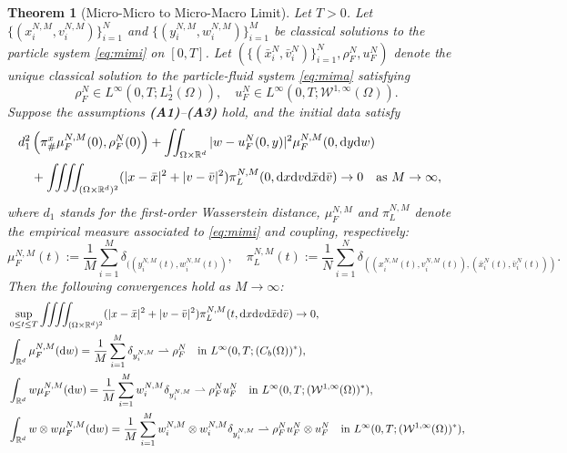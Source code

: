 \documentclass[10pt, reqno]{amsart}
\newtheorem{theorem}{Theorem}[section]
\theoremstyle{definition}
\theoremstyle{remark}
\numberwithin{equation}{section}
\newcommand{\dx}{\textnormal{d}x}
\newcommand{\dy}{\textnormal{d}y}
\newcommand{\dv}{\textnormal{d}v}
\newcommand{\dw}{\textnormal{d}w}
\newcommand{\calW}{\mathcal W}
\newcommand{\R}{\mathbb{R}}
\newcommand{\weakto}{\rightharpoonup}
\begin{document}
\begin{theorem}[Micro-Micro to Micro-Macro Limit]\label{thm:mimi-mima}
Let $T>0$. Let $ \{(x^{N,M}_i,v^{N,M}_i) \}_{i=1}^N$ and $ \{(y^{N,M}_i,w^{N,M}_i) \}_{i=1}^M$ be classical solutions to the particle system \eqref{eq:mimi} on $[0,T]$. Let $(\{(\bar{x}^N_i, \bar{v}^N_i) \}_{i=1}^N, \rho_F^N, u_F^N)$ denote the unique classical solution to the particle-fluid system \eqref{eq:mima} satisfying 
\[
\rho_F^N \in L^\infty(0,T; L^1_2(\Omega)), \quad u_F^N \in L^\infty(0,T;\calW^{1,\infty}(\Omega)).
\] 
Suppose the assumptions {\bf (A1)}--{\bf (A3)} hold, and the initial data satisfy
\begin{align}\label{ass_mimi-mima}
\begin{aligned}
&d_1^2\left(\pi^x_\#\mu_F^{N,M}(0), \rho_F^N(0) \right) + \iint_{\Omega \times \R^d} |w - u_F^N(0,y)|^2 \mu_F^{N,M}(0,\dy \dw)  \cr
&\quad + \iiiint_{(\Omega \times \R^d)^2} (|x-\bar x|^2 + |v-\bar v|^2) \pi_L^{N,M}(0,\dx \dv {\rm d}\bar x {\rm d}\bar v) \to 0 \quad \mbox{as } M \to \infty, 
\end{aligned}
\end{align}
where $d_1$ stands for the first-order Wasserstein distance, $\mu_F^{N,M}$ and $\pi_L^{N,M}$ denote the empirical measure associated to \eqref{eq:mimi} and coupling, respectively:
\[
\mu_F^{N,M}(t) := \frac1M\sum_{i=1}^M \delta_{((y_i^{N,M}(t), w_i^{N,M}(t))}, \quad  \pi_L^{N,M}(t) := \frac1N \sum_{i=1}^N \delta_{\left((x_i^{N,M}(t), v_i^{N,M}(t)), (\bar x_i^{N}(t), \bar v_i^{N}(t))\right)}.
\]
Then the following convergences hold as $M \to \infty$:
\begin{equation} \label{eq: thm micmic conv}
\begin{split}
    &\sup_{0\le t \le T} \iiiint_{(\Omega \times \R^d)^2} (|x-\bar x|^2 + |v-\bar v|^2) \pi_L^{N,M}(t,\dx \dv {\rm d}\bar x {\rm d}\bar v) \to 0,\\
    &\int_{\R^d}\mu_F^{N,M}( \dw) = \frac{1}{M}\sum_{i=1}^M \delta_{y_i^{N,M}}  \weakto \rho_F^N \quad \text{in } L^\infty(0,T;(C_b(\Omega))^*),\\
    &\int_{\R^d}w\mu_F^{N,M}(\dw) = \frac{1}{M}\sum_{i=1}^M w_i^{N,M} \delta_{y_i^{N,M}} \weakto \rho_F^N u_F^N \quad \text{in }  L^\infty(0,T;(  \calW^{1,\infty} (\Omega))^*),\\
    &\int_{\R^d}w \otimes w \mu_F^{N,M}(\dw) = \frac{1}{M}\sum_{i=1}^M w_i^{N,M} \otimes  w_i^{N,M}\delta_{y_i^{N,M}} \weakto \rho_F^N u_F^N \otimes u_F^N \quad \text{in }  L^\infty(0,T;(  \calW^{1,\infty}  (\Omega) )^*),    \\

\end{split}
\end{equation}
\end{theorem}
\end{document}
